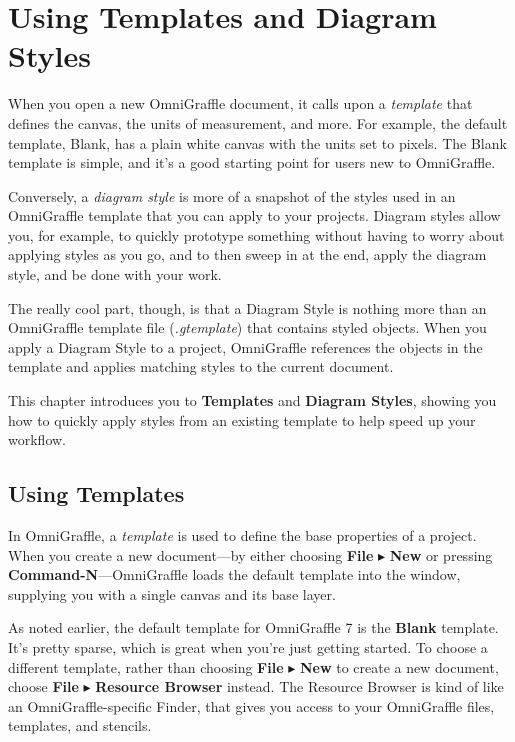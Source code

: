 \documentclass[../main.tex]{subfiles}
\begin{document}
\chapter{Using Templates and Diagram Styles}

When you open a new OmniGraffle document, it calls upon a \textit{template} that defines the
canvas, the units of measurement, and more. For example, the default template, Blank, has a
plain white canvas with the units set to pixels. The Blank template is simple, and it's a good
starting point for users new to OmniGraffle.

Conversely, a \textit{diagram style} is more of a snapshot of the styles used in an OmniGraffle
template that you can apply to your projects. Diagram styles allow you, for example, to
quickly prototype something without having to worry about applying styles as you go, and to
then sweep in at the end, apply the diagram style, and be done with your work.

\begin{ognote}
  The really cool part, though, is that a Diagram Style is nothing more than an OmniGraffle
  template file (\textit{.gtemplate}) that contains styled objects. When you apply a Diagram
  Style to a project, OmniGraffle references the objects in the template and applies matching
  styles to the current document.
\end{ognote}

This chapter introduces you to \textbf{Templates} and \textbf{Diagram Styles}, showing you how
to quickly apply styles from an existing template to help speed up your workflow.

\section{Using Templates}

In OmniGraffle, a \textit{template} is used to define the base properties of a project. When you
create a new document---by either choosing \textbf{File} $\blacktriangleright$ \textbf{New} or
pressing \textbf{Command-N}---OmniGraffle loads the default template into the window,
supplying you with a single canvas and its base layer.

As noted earlier, the default template for OmniGraffle 7 is the \textbf{Blank} template. It's
pretty sparse, which is great when you're just getting started. To choose a different
template, rather than choosing \textbf{File} $\blacktriangleright$ \textbf{New} to create a
new document, choose \textbf{File} $\blacktriangleright$ \textbf{Resource Browser} instead.
The Resource Browser is kind of like an OmniGraffle-specific Finder, that gives you access to
your OmniGraffle files, templates, and stencils.
\end{document}
